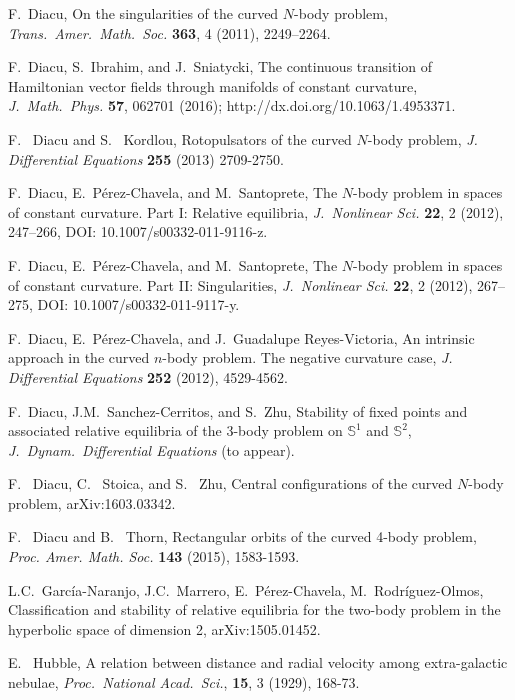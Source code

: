 \documentclass[12pt]{amsart}
\theoremstyle{definition}
\def \mb{\mathbb}
\def \S{\mb S}        %
\begin{document}
{\begin{thebibliography}{99}
 F.\ Diacu, On the singularities of the curved $N$-body problem, {\it Trans.\ Amer.\ Math.\ Soc.} {\bf 363}, 4 (2011), 2249--2264.

 F.\ Diacu, S.\ Ibrahim, and J.\ Sniatycki, The continuous transition of Hamiltonian vector fields through manifolds of constant curvature, {\it J.\ Math.\ Phys.}  {\bf 57}, 062701 (2016); http://dx.doi.org/10.1063/1.4953371.

 F. \ Diacu and S. \ Kordlou, Rotopulsators of the curved $N$-body problem, {\it J. Differential Equations} {\bf 255} (2013) 2709-2750.

 F.~Diacu, E.~P\'erez-Chavela, and M.~Santoprete, The
$N$-body problem in spaces of constant curvature. Part I: Relative equilibria,
{\it J.\ Nonlinear Sci.} {\bf 22}, 2 (2012), 247--266, DOI: 10.1007/s00332-011-9116-z.

 F.~Diacu, E.~P\'erez-Chavela, and M.~Santoprete, The $N$-body problem in spaces of constant curvature. Part II: Singularities,
{\it J.\ Nonlinear Sci.} {\bf 22}, 2 (2012), 267--275, DOI: 10.1007/s00332-011-9117-y.


 F.\ Diacu, E.\ P\'erez-Chavela, and J.\ Guadalupe Reyes-Victoria, An intrinsic approach in the curved $n$-body problem. The negative curvature case, {\it J. Differential Equations} {\bf 252} (2012), 4529-4562.

 F.\ Diacu, J.M.\ Sanchez-Cerritos, and S.\ Zhu, Stability of fixed points and associated relative equilibria of the 3-body problem on $\S^1$ and $\S^2$, {\it J.\ Dynam.\ Differential Equations} (to appear).

 F. \ Diacu, C. \ Stoica, and S. \ Zhu, Central configurations of the curved $N$-body problem, arXiv:1603.03342.

 F. \ Diacu and B. \ Thorn, Rectangular orbits of the curved 4-body problem, {\it Proc. Amer. Math. Soc.} {\bf143} (2015), 1583-1593.

 L.C.\ Garc\'ia-Naranjo, J.C.\ Marrero, E.\ P\'erez-Chavela, M.\ Rodr\'iguez-Olmos, Classification and stability of relative equilibria for the two-body problem in the hyperbolic space of dimension 2, arXiv:1505.01452.

 E. \ Hubble, A relation between distance and radial velocity among extra-galactic nebulae, {\it Proc.\ National Acad.\ Sci.}, {\bf 15}, 3 (1929), 168-73.


\end{thebibliography}}
\end{document}
